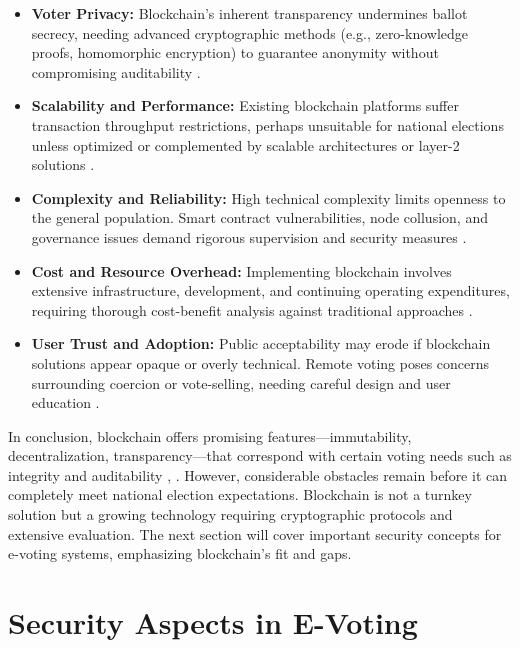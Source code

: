 \documentclass[a4paper,10pt]{report}
\begin{document}
 \begin{itemize} \item \textbf{Voter Privacy:}  Blockchain’s inherent transparency undermines ballot secrecy, needing advanced cryptographic methods (e.g., zero-knowledge proofs, homomorphic encryption) to guarantee anonymity without compromising auditability \cite{arxiv2021}.

   \item \textbf {Scalability and Performance:}  Existing blockchain platforms suffer transaction throughput restrictions, perhaps unsuitable for national elections unless optimized or complemented by scalable architectures or layer-2 solutions \cite{mdpi2020}. 

   \item \textbf {Complexity and Reliability:}  High technical complexity limits openness to the general population.  Smart contract vulnerabilities, node collusion, and governance issues demand rigorous supervision and security measures \cite{pmc2020_access}. 

   \item \textbf {Cost and Resource Overhead:}  Implementing blockchain involves extensive infrastructure, development, and continuing operating expenditures, requiring thorough cost-benefit analysis against traditional approaches \cite{mdpi2020}. 

   \item \textbf {User Trust and Adoption:}  Public acceptability may erode if blockchain solutions appear opaque or overly technical.  Remote voting poses concerns surrounding coercion or vote-selling, needing careful design and user education \cite{mdpi2020}.
 \end{itemize}

 In conclusion, blockchain offers promising features—immutability, decentralization, transparency—that correspond with certain voting needs such as integrity and auditability \cite{mdpi2020}, \cite{pmc2020_access}.  However, considerable obstacles remain before it can completely meet national election expectations.  Blockchain is not a turnkey solution but a growing technology requiring cryptographic protocols and extensive evaluation.  The next section will cover important security concepts for e-voting systems, emphasizing blockchain’s fit and gaps.

\section{Security Aspects in E-Voting}
\end{document}
